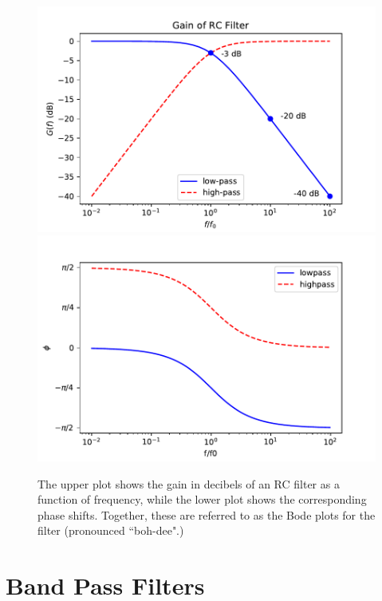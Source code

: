 \documentclass[12pt,oneside]{book}
\begin{document}
\begin{figure}[htbp]
\begin{center}
\includegraphics[height=0.3\textheight]{figs/rcgaindb.pdf} \\
\includegraphics[height=0.3\textheight]{figs/rcphase.pdf} \\
\caption{ The upper plot shows the gain in decibels of an RC filter as a function of frequency, while the lower plot shows the corresponding phase shifts.  Together, these are referred to as the Bode plots for the filter (pronounced ``boh-dee".)}
\label{fig:rcbode}
\end{center}
\end{figure}


\section{Band Pass Filters}
\end{document}
